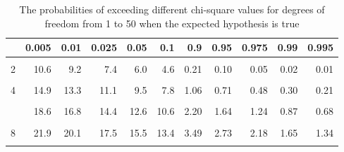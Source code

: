 \documentclass[11pt,ignorenonframetext,aspectratio=169]{beamer}
\begin{document}
\begin{frame}{}
\protect\hypertarget{section-4}{}
\begin{table}

\caption{\label{tab:chi-sqrt-values}The probabilities of exceeding different chi-square values for degrees of freedom from 1 to 50 when the expected hypothesis is true}
\centering
\fontsize{5}{7}\selectfont
\begin{tabular}[t]{lrrrr|>{}rrrrrr}
\toprule
  & 0.005 & 0.01 & 0.025 & 0.05 & 0.1 & 0.9 & 0.95 & 0.975 & 0.99 & 0.995\\
\midrule
\cellcolor{gray!6}{1} & \cellcolor{gray!6}{7.9} & \cellcolor{gray!6}{6.6} & \cellcolor{gray!6}{5.0} & \cellcolor{gray!6}{3.8} & \cellcolor{gray!6}{2.7} & \cellcolor{gray!6}{0.02} & \cellcolor{gray!6}{0.00} & \cellcolor{gray!6}{0.00} & \cellcolor{gray!6}{0.00} & \cellcolor{gray!6}{0.00}\\
2 & 10.6 & 9.2 & 7.4 & 6.0 & 4.6 & 0.21 & 0.10 & 0.05 & 0.02 & 0.01\\
\cellcolor{gray!6}{3} & \cellcolor{gray!6}{12.8} & \cellcolor{gray!6}{11.3} & \cellcolor{gray!6}{9.3} & \cellcolor{gray!6}{7.8} & \cellcolor{gray!6}{6.2} & \cellcolor{gray!6}{0.58} & \cellcolor{gray!6}{0.35} & \cellcolor{gray!6}{0.22} & \cellcolor{gray!6}{0.11} & \cellcolor{gray!6}{0.07}\\
4 & 14.9 & 13.3 & 11.1 & 9.5 & 7.8 & 1.06 & 0.71 & 0.48 & 0.30 & 0.21\\
\cellcolor{gray!6}{5} & \cellcolor{gray!6}{16.8} & \cellcolor{gray!6}{15.1} & \cellcolor{gray!6}{12.8} & \cellcolor{gray!6}{11.1} & \cellcolor{gray!6}{9.2} & \cellcolor{gray!6}{1.61} & \cellcolor{gray!6}{1.15} & \cellcolor{gray!6}{0.83} & \cellcolor{gray!6}{0.55} & \cellcolor{gray!6}{0.41}\\
\addlinespace
6 & 18.6 & 16.8 & 14.4 & 12.6 & 10.6 & 2.20 & 1.64 & 1.24 & 0.87 & 0.68\\
\cellcolor{gray!6}{7} & \cellcolor{gray!6}{20.3} & \cellcolor{gray!6}{18.5} & \cellcolor{gray!6}{16.0} & \cellcolor{gray!6}{14.1} & \cellcolor{gray!6}{12.0} & \cellcolor{gray!6}{2.83} & \cellcolor{gray!6}{2.17} & \cellcolor{gray!6}{1.69} & \cellcolor{gray!6}{1.24} & \cellcolor{gray!6}{0.99}\\
8 & 21.9 & 20.1 & 17.5 & 15.5 & 13.4 & 3.49 & 2.73 & 2.18 & 1.65 & 1.34\\
\cellcolor{gray!6}{9} & \cellcolor{gray!6}{23.6} & \cellcolor{gray!6}{21.7} & \cellcolor{gray!6}{19.0} & \cellcolor{gray!6}{16.9} & \cellcolor{gray!6}{14.7} & \cellcolor{gray!6}{4.17} & \cellcolor{gray!6}{3.33} & \cellcolor{gray!6}{2.70} & \cellcolor{gray!6}{2.09} & \cellcolor{gray!6}{1.73}\\

\end{tabular}
\end{table}
\end{frame}
\end{document}
